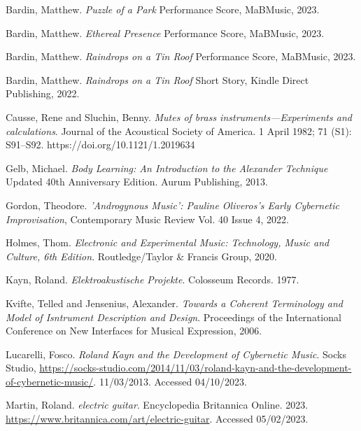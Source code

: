 \begin{thebibliography}{99} %


 Bardin, Matthew. \emph{Puzzle of a Park} Performance Score, MaBMusic, 2023.

 Bardin, Matthew. \emph{Ethereal Presence} Performance Score, MaBMusic, 2023.

 Bardin, Matthew. \emph{Raindrops on a Tin Roof} Performance Score, MaBMusic, 2023.

 Bardin, Matthew. \emph{Raindrops on a Tin Roof} Short Story, Kindle Direct Publishing, 2022.

 Causse, Rene and Sluchin, Benny. \emph{Mutes of brass instruments—Experiments and calculations}. Journal of the Acoustical Society of America. 1 April 1982; 71 (S1): S91–S92. https://doi.org/10.1121/1.2019634


 Gelb, Michael. \emph{Body Learning: An Introduction to the Alexander Technique} Updated 40th Anniversary Edition. Aurum Publishing, 2013.

 Gordon, Theodore. \emph{'Androgynous Music': Pauline Oliveros's Early Cybernetic Improvisation}, Contemporary Music Review Vol. 40 Issue 4, 2022.

 Holmes, Thom. \emph{Electronic and Experimental Music: Technology, Music and Culture, 6th Edition}. Routledge/Taylor \& Francis Group, 2020.

 Kayn, Roland. \emph{Elektroakustische Projekte}. Colosseum Records. 1977.

 Kvifte, Telled and Jensenius, Alexander. \emph{Towards a Coherent Terminology and Model of Isntrument Description and Design}. Proceedings of the International Conference on New Interfaces for Musical Expression, 2006.

 Lucarelli, Fosco. \emph{Roland Kayn and the Development of Cybernetic Music}. Socks Studio, \url{https://socks-studio.com/2014/11/03/roland-kayn-and-the-development-of-cybernetic-music/}. 11/03/2013. Accessed 04/10/2023.

 Martin, Roland. \emph{electric guitar}. Encyclopedia Britannica Online. 2023. \url{https://www.britannica.com/art/electric-guitar}. Accessed 05/02/2023.


\end{thebibliography}
